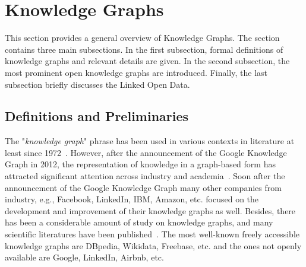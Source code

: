 \section{Knowledge Graphs}
\label{cha:foundations_basics_kb}
This section provides a general overview of Knowledge Graphs.  The section contains three main subsections. In the first subsection, formal definitions of knowledge graphs and relevant details are given. In the second subsection, the most prominent open knowledge graphs are introduced. Finally, the last subsection briefly discusses the Linked Open Data.
\subsection{Definitions and Preliminaries}
The "\textit{knowledge graph}" phrase has been used in various contexts in literature at least since  1972~\cite{hogan2020knowledge}. However, after the announcement of the Google Knowledge Graph in 2012, the representation of knowledge in a graph-based form has attracted significant attention across industry and academia~\cite{DBLP:journals/semweb/Paulheim17}. Soon after the announcement of the Google Knowledge Graph many other companies from industry, e.g., Facebook, LinkedIn, IBM, Amazon, etc. focused on the development and improvement of their knowledge graphs as well. Besides, there has been a considerable amount of study on knowledge graphs, and many scientific literatures have been published~\cite{hogan2020knowledge,DBLP:journals/semweb/Paulheim17,def_of_KGs_16,farber2015comparative}. The most well-known freely accessible knowledge graphs are DBpedia, Wikidata, Freebase, etc. and the ones not openly available are Google, LinkedIn, Airbnb, etc.

